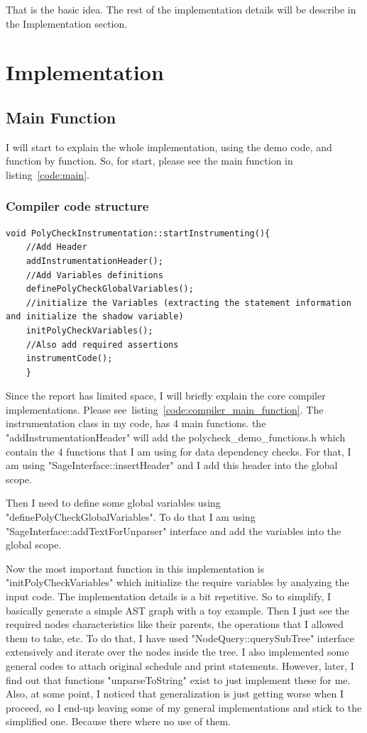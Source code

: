 \documentclass[letterpaper,12pt]{article}
\begin{document}
  That is the basic idea. The rest of the implementation details will be describe in the Implementation section.
  
 
    
	
	\section{Implementation}
	\subsection{Main Function}
	I will start to explain the whole implementation, using the demo code, and function by function. So, for start, please see the main function in listing~\ref{code:main}.
	
	\subsubsection{Compiler code structure}
	
	 \begin{lstlisting}[caption={The core function that does the instrumentation in ROSE code}, label={code:compiler_main_function}, captionpos=b]
	void PolyCheckInstrumentation::startInstrumenting(){
	//Add Header
	addInstrumentationHeader();
	//Add Variables definitions
	definePolyCheckGlobalVariables();
	//initialize the Variables (extracting the statement information and initialize the shadow variable)
	initPolyCheckVariables();
	//Also add required assertions
	instrumentCode();
	}
	\end{lstlisting}
	
	
	Since the report has limited space, I will briefly explain the core compiler implementations. Please see~listing~\ref{code:compiler_main_function}. The instrumentation class in my code, has 4 main functions. the "addInstrumentationHeader" will add the polycheck\_demo\_functions.h which contain the 4 functions that I am using for data dependency checks. For that, I am using "SageInterface::insertHeader" and I add this header into the global scope.
	
	Then I need to define some global variables using "definePolyCheckGlobalVariables". To do that I am using "SageInterface::addTextForUnparser" interface and add the variables into the global scope.
	
	Now the most important function in this implementation is "initPolyCheckVariables" which initialize the require variables by analyzing the input code. The implementation details is a bit repetitive. So to simplify, I basically generate a simple AST graph with a toy example. Then I just see the required nodes characteristics like their parents, the operations that I allowed them to take, etc. To do that, I have used "NodeQuery::querySubTree" interface extensively and iterate over the nodes inside the tree. I also implemented some general codes to attach original schedule and print statements. However, later, I find out that functions "unparseToString" exist to just implement these for me. Also, at some point, I noticed that generalization is just getting worse when I proceed, so I end-up leaving some of my general implementations and stick to the simplified one. Because there where no use of them. 
	
\end{document}
